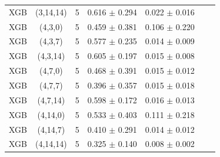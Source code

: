\begin{longtable}{lcccccc}
XGB & (3,14,14) & 5 & 0.616 $\pm$ 0.294 & 0.022 $\pm$ 0.016 \\
XGB & (4,3,0) & 5 & 0.459 $\pm$ 0.381 & 0.106 $\pm$ 0.220 \\
XGB & (4,3,7) & 5 & 0.577 $\pm$ 0.235 & 0.014 $\pm$ 0.009 \\
XGB & (4,3,14) & 5 & 0.605 $\pm$ 0.197 & 0.015 $\pm$ 0.008 \\
XGB & (4,7,0) & 5 & 0.468 $\pm$ 0.391 & 0.015 $\pm$ 0.012 \\
XGB & (4,7,7) & 5 & 0.396 $\pm$ 0.357 & 0.015 $\pm$ 0.018 \\
XGB & (4,7,14) & 5 & 0.598 $\pm$ 0.172 & 0.016 $\pm$ 0.013 \\
XGB & (4,14,0) & 5 & 0.533 $\pm$ 0.403 & 0.111 $\pm$ 0.218 \\
XGB & (4,14,7) & 5 & 0.410 $\pm$ 0.291 & 0.014 $\pm$ 0.012 \\
XGB & (4,14,14) & 5 & 0.325 $\pm$ 0.140 & 0.008 $\pm$ 0.002 \\
\end{longtable}

